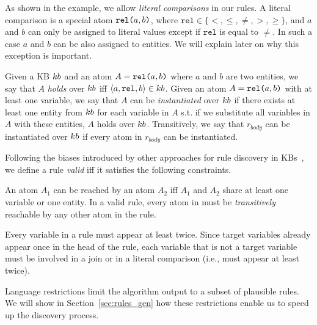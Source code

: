 As shown in the example, we allow \emph{literal comparisons} in our rules. A literal comparison is a special atom $\texttt{rel(}a,b\texttt{)}$, where $\texttt{rel} \in \{<,\leq,\neq,>,\geq\}$, and $a$ and $b$ can only be assigned to literal values except if $\texttt{rel}$ is equal to $\neq$. In such a case $a$ and $b$ can be also assigned to entities. We will explain later on why this exception is important.

Given a KB ${\sc kb}$ and an atom $A=\texttt{rel(}a,b\texttt{)}$ where $a$ and $b$ are two entities, we say that $A$ \emph{holds} over ${\sc kb}$ iff $\langle a,\texttt{rel},b\rangle \in {\sc kb}$.
Given %
an atom $A=\texttt{rel(}a,b\texttt{)}$ with at least one variable, we say that $A$ can be \emph{instantiated} over ${\sc kb}$ if there exists at least one entity from ${\sc kb}$ for each variable in $A$ s.t. if we substitute all variables in $A$ with these entities, $A$ holds over ${\sc kb}$. Transitively, %
we say that $r_{body}$ can be instantiated over ${\sc kb}$ if every atom in $r_{body}$ can be instantiated. 

Following the biases introduced by other approaches for rule discovery in KBs~\cite{galarraga2015fast,Chen:2016}, 
we define a rule \emph{valid} iff it satisfies the following constraints.

 An atom $A_1$ can be reached by an atom $A_2$ iff $A_1$ and $A_2$ share at least one variable or one entity. 
In a valid rule, every atom in must be \emph{transitively} reachable by any other atom in the rule.

 Every variable in a rule must appear at least twice. Since target variables already appear once in the head of the rule, 
each variable that is not a target variable must be involved in a join or in a literal comparison (i.e., must appear at least twice).

Language restrictions limit the algorithm output 
to a subset of plausible rules. We will show in Section~\ref{sec:rules_gen} how these restrictions enable us to speed up the discovery process. %

